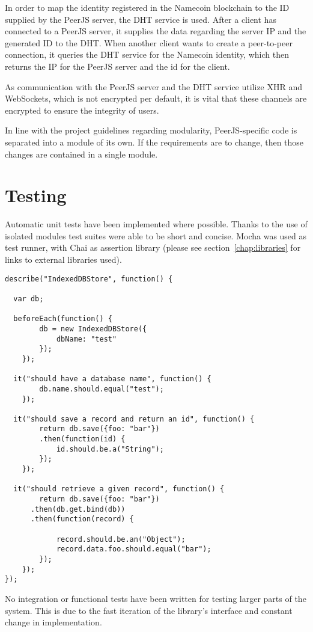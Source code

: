 In order to map the identity registered in the Namecoin blockchain to the ID supplied by the PeerJS server, the DHT service is used. After a client has connected to a PeerJS server, it supplies the data regarding the server IP and the generated ID to the DHT. When another client wants to create a peer-to-peer connection, it queries the DHT service for the Namecoin identity, which then returns the IP for the PeerJS server and the id for the client.

As communication with the PeerJS server and the DHT service utilize XHR and WebSockets, which is not encrypted per default, it is vital that these channels are encrypted to ensure the integrity of users.

In line with the project guidelines regarding modularity, PeerJS-specific code is separated into a module of its own. If the requirements are to change, then those changes are contained in a single module.

\section{Testing}
\label{sec:testing}

Automatic unit tests have been implemented where possible. Thanks to the use of isolated modules test suites were able to be short and concise. Mocha was used as test runner, with Chai as assertion library (please see section~\ref{chap:libraries} for links to external libraries used).

\begin{Code}
\begin{lstlisting}[caption={Sample test suite}, label={lst:testsuite}]
describe("IndexedDBStore", function() {

  var db;

  beforeEach(function() {
		db = new IndexedDBStore({
			dbName: "test"
		});
	});

  it("should have a database name", function() {
		db.name.should.equal("test");
	});

  it("should save a record and return an id", function() {
		return db.save({foo: "bar"})
		.then(function(id) {
			id.should.be.a("String");
		});
	});

  it("should retrieve a given record", function() {
		return db.save({foo: "bar"})
      .then(db.get.bind(db))
      .then(function(record) {

			record.should.be.an("Object");
			record.data.foo.should.equal("bar");
		});
	});
});
\end{lstlisting}
\end{Code}

No integration or functional tests have been written for testing larger parts of the system. This is due to the fast iteration of the library's interface and constant change in implementation.
